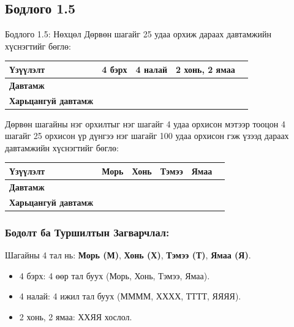\documentclass[11pt,a4paper]{article}
\begin{document}
\vspace{0.8em}

\subsection*{Бодлого 1.5}

\begin{problembox}{Бодлого 1.5: Нөхцөл}
Дөрвөн шагайг 25 удаа орхиж дараах давтамжийн хүснэгтийг бөглө:
\begin{center}
\small
\begin{tabular}{lcccc}
\toprule
\textbf{Үзүүлэлт} & \textbf{4 бэрх} & \textbf{4 налай} & \textbf{2 хонь, 2 ямаа} \\
\midrule
\textbf{Давтамж} & & & \\
\textbf{Харьцангуй давтамж} & & & \\
\bottomrule
\end{tabular}
\end{center}
Дөрвөн шагайны нэг орхилтыг нэг шагайг 4 удаа орхисон мэтээр тооцон 4 шагайг 25 орхисон үр дүнгээ нэг шагайг 100 удаа орхисон гэж үзээд дараах давтамжийн хүснэгтийг бөглө:
\begin{center}
\small
\begin{tabular}{lccccc}
\toprule
\textbf{Үзүүлэлт} & \textbf{Морь} & \textbf{Хонь} & \textbf{Тэмээ} & \textbf{Ямаа} \\
\midrule
\textbf{Давтамж} & & & & \\
\textbf{Харьцангуй давтамж} & & & & \\
\bottomrule
\end{tabular}
\end{center}
\end{problembox}

\subsubsection*{Бодолт ба Туршилтын Загварчлал:}

Шагайны 4 тал нь: \textbf{Морь (М)}, \textbf{Хонь (Х)}, \textbf{Тэмээ (Т)}, \textbf{Ямаа (Я)}.
\begin{itemize}[itemsep=1pt]
  \item 4 бэрх: 4 өөр тал буух (Морь, Хонь, Тэмээ, Ямаа).
  \item 4 налай: 4 ижил тал буух (ММММ, ХХХХ, ТТТТ, ЯЯЯЯ).
  \item 2 хонь, 2 ямаа: ХХЯЯ хослол.
\end{itemize}
\end{document}

